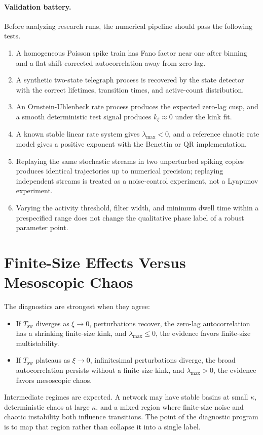 \paragraph{Validation battery.}
Before analyzing research runs, the numerical pipeline should pass the
following tests.
\begin{enumerate}
    \item A homogeneous Poisson spike train has Fano factor near one after
    binning and a flat shift-corrected autocorrelation away from zero lag.
    \item A synthetic two-state telegraph process is recovered by the state
    detector with the correct lifetimes, transition times, and active-count
    distribution.
    \item An Ornstein-Uhlenbeck rate process produces the expected zero-lag
    cusp, and a smooth deterministic test signal produces \(k_\xi\approx 0\)
    under the kink fit.
    \item A known stable linear rate system gives \(\lambda_{\max}<0\), and a
    reference chaotic rate model gives a positive exponent with the Benettin or
    QR implementation.
    \item Replaying the same stochastic streams in two unperturbed spiking
    copies produces identical trajectories up to numerical precision; replaying
    independent streams is treated as a noise-control experiment, not a
    Lyapunov experiment.
    \item Varying the activity threshold, filter width, and minimum dwell time
    within a prespecified range does not change the qualitative phase label of
    a robust parameter point.
\end{enumerate}

\section{Finite-Size Effects Versus Mesoscopic Chaos}
\label{sec:ch09-decision-table}

The diagnostics are strongest when they agree:
\begin{itemize}
    \item If \(T_{\mathrm{sw}}\) diverges as \(\xi\to 0\), perturbations recover,
    the zero-lag autocorrelation has a shrinking finite-size kink, and
    \(\lambda_{\max}\le 0\), the evidence favors finite-size multistability.
    \item If \(T_{\mathrm{sw}}\) plateaus as \(\xi\to 0\), infinitesimal
    perturbations diverge, the broad autocorrelation persists without a
    finite-size kink, and \(\lambda_{\max}>0\), the evidence favors mesoscopic
    chaos.
\end{itemize}
Intermediate regimes are expected. A network may have stable basins at small
\(\kappa\), deterministic chaos at large \(\kappa\), and a mixed region where
finite-size noise and chaotic instability both influence transitions. The point
of the diagnostic program is to map that region rather than collapse it into a
single label.

